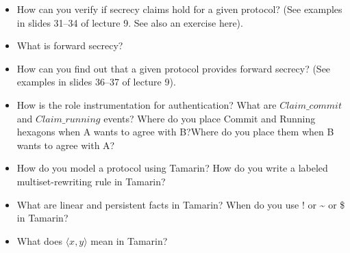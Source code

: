 \begin{itemize}
\item How can you verify if secrecy claims hold for a given protocol? (See examples in slides 31--34 of lecture 9. See also an exercise here).
\item What is forward secrecy?
\item How can you find out that a given protocol provides forward secrecy? (See examples in slides 36--37 of lecture 9).
\item How is the role instrumentation for authentication? What are $Claim\_commit$ and $Claim\_running$ events? Where do you place Commit and Running hexagons when A wants to agree with B?\@ Where do you place them when B wants to agree with A?\@
\item How do you model a protocol using Tamarin? How do you write a labeled multiset-rewriting rule in Tamarin?
\item What are linear and persistent facts in Tamarin? When do you use ! or \textasciitilde{} or \$ in Tamarin?
\item What does $\langle x, y \rangle$ mean in Tamarin?
\end{itemize}
